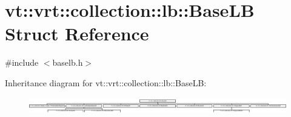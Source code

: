 \hypertarget{structvt_1_1vrt_1_1collection_1_1lb_1_1_base_l_b}{}\section{vt\+:\+:vrt\+:\+:collection\+:\+:lb\+:\+:Base\+LB Struct Reference}
\label{structvt_1_1vrt_1_1collection_1_1lb_1_1_base_l_b}


{\ttfamily \#include $<$baselb.\+h$>$}

Inheritance diagram for vt\+:\+:vrt\+:\+:collection\+:\+:lb\+:\+:Base\+LB\+:\begin{figure}[H]
\begin{center}
\leavevmode
\includegraphics[height=0.712166cm]{structvt_1_1vrt_1_1collection_1_1lb_1_1_base_l_b}
\end{center}
\end{figure}
